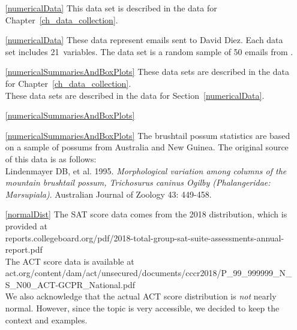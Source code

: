 \begin{itemize}

\item[\ref{numericalData}]
    This data set is described in
    the data for Chapter~\ref{ch_data_collection}.

\item[\ref{numericalData}]
    These data represent emails sent to David Diez.
    Each data set includes 21~variables.
    The  data set is a random sample
    of 50 emails from .

\item[\ref{numericalSummariesAndBoxPlots}]
    These data sets are described in
    the data for Chapter~\ref{ch_data_collection}. \\
    These data sets are described in
    the data for Section~\ref{numericalData}.

\item[\ref{numericalSummariesAndBoxPlots}]
    \\

\item[\ref{numericalSummariesAndBoxPlots}]
    The brushtail possum statistics are based on a sample
    of possums from Australia and New Guinea.
    The original source of this data is as follows:\\
    Lindenmayer DB, et al. 1995.
    \emph{Morphological variation among columns of the
        mountain brushtail possum, Trichosurus caninus
        Ogilby (Phalangeridae: Marsupiala)}.
    Australian Journal of Zoology 43: 449-458.

\item[\ref{normalDist}]
    The SAT score data comes from the 2018 distribution,
    which is provided at \\
    {\small
        {reports.collegeboard.org/pdf/2018-total-group-sat-suite-assessments-annual-report.pdf}} \\
    The ACT score data is available at \\
    {\footnotesize
        {act.org/content/dam/act/unsecured/documents/cccr2018/P\_99\_999999\_N\_S\_N00\_ACT-GCPR\_National.pdf}} \\
    We also acknowledge that the actual ACT score distribution
    is \emph{not} nearly normal.
    However, since the topic is very accessible,
    we decided to keep the context and examples.


\end{itemize}
